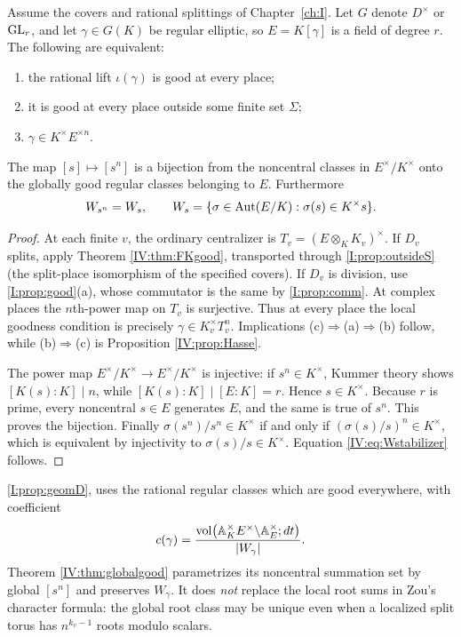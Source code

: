 \begin{theorem}\label{IV:thm:globalgood}
Assume the covers and rational splittings of Chapter~\ref{ch:I}.  Let
$G$ denote $D^\times$ or $\operatorname{GL}_r$, and let $\gamma\in G(K)$ be
regular elliptic, so $E=K[\gamma]$ is a field of degree $r$.
The following are equivalent:
\begin{enumerate}[label=(\alph*)]
\item the rational lift $\iota(\gamma)$ is good at every place;
\item it is good at every place outside some finite set $\Sigma$;
\item $\gamma\in K^\times E^{\times n}$.
\end{enumerate}
The map $[s]\mapsto[s^n]$ is a bijection from the noncentral
classes in $E^\times/K^\times$ onto the globally good regular
classes belonging to $E$.  Furthermore
\begin{equation}\label{IV:eq:Wstabilizer}
 W_{s^n}=W_s,\qquad
 W_s=\{\sigma\in\operatorname{Aut}(E/K):\sigma(s)\in K^\times s\}.
\end{equation}
\end{theorem}
\begin{proof}
At each finite $v$, the ordinary centralizer is
$T_v=(E\otimes_K K_v)^\times$.  If $D_v$ splits, apply
Theorem \ref{IV:thm:FKgood}, transported through \cref{I:prop:outsideS} (the split-place
isomorphism of the specified covers).  If $D_v$ is division, use \cref{I:prop:good}(a), whose commutator is the same by \cref{I:prop:comm}.  At complex places the $n$th-power map on
$T_v$ is surjective.  Thus at every place the local goodness
condition is precisely
$\gamma\in K_v^\times T_v^n$.
Implications (c)$\Rightarrow$(a)$\Rightarrow$(b) follow,
while (b)$\Rightarrow$(c) is Proposition \ref{IV:prop:Hasse}.

The power map $E^\times/K^\times\to E^\times/K^\times$
is injective: if $s^n\in K^\times$, Kummer theory shows
$[K(s):K]\mid n$, while $[K(s):K]\mid [E:K]=r$.
Hence $s\in K^\times$.  Because $r$ is prime, every noncentral
$s\in E$ generates $E$, and the same is true of $s^n$.
This proves the bijection.  Finally
$\sigma(s^n)/s^n\in K^\times$ if and only if
$(\sigma(s)/s)^n\in K^\times$, which is equivalent by injectivity
to $\sigma(s)/s\in K^\times$.  Equation \eqref{IV:eq:Wstabilizer}
follows.
\end{proof}

\begin{remark}
\cref{I:prop:geomD}, uses the rational regular classes which
are good everywhere, with coefficient
\begin{equation}\label{IV:eq:globalvol}
 c(\gamma)=\frac{\operatorname{vol}\bigl(\mathbb A_K^\times E^\times\backslash
 \mathbb A_E^\times;dt\bigr)}{|W_\gamma|}.
\end{equation}
Theorem \ref{IV:thm:globalgood} parametrizes its noncentral
summation set by global $[s^n]$ and preserves $W_\gamma$.
It does \emph{not} replace the local root sums in Zou's
character formula: the global root class may be unique even when
a localized split torus has $n^{k_v-1}$ roots modulo scalars.
\end{remark}

